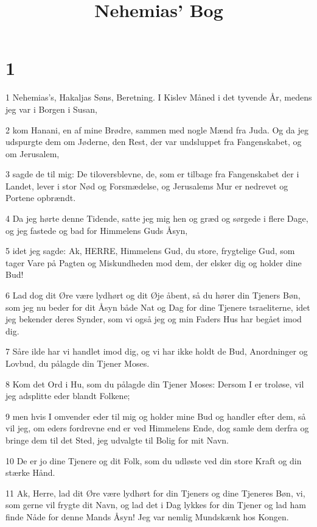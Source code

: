 

\title{Nehemias' Bog}


\chapter{1}

\par 1 Nehemias's, Hakaljas Søns, Beretning. I Kislev Måned i det tyvende År, medens jeg var i Borgen i Susan,
\par 2 kom Hanani, en af mine Brødre, sammen med nogle Mænd fra Juda. Og da jeg udspurgte dem om Jøderne, den Rest, der var undsluppet fra Fangenskabet, og om Jerusalem,
\par 3 sagde de til mig: De tiloversblevne, de, som er tilbage fra Fangenskabet der i Landet, lever i stor Nød og Forsmædelse, og Jerusalems Mur er nedrevet og Portene opbrændt.
\par 4 Da jeg hørte denne Tidende, satte jeg mig hen og græd og sørgede i flere Dage, og jeg fastede og bad for Himmelens Guds Åsyn,
\par 5 idet jeg sagde: Ak, HERRE, Himmelens Gud, du store, frygtelige Gud, som tager Vare på Pagten og Miskundheden mod dem, der elsker dig og holder dine Bud!
\par 6 Lad dog dit Øre være lydhørt og dit Øje åbent, så du hører din Tjeners Bøn, som jeg nu beder for dit Åsyn både Nat og Dag for dine Tjenere tsraeliterne, idet jeg bekender deres Synder, som vi også jeg og min Faders Hus har begået imod dig.
\par 7 Såre ilde har vi handlet imod dig, og vi har ikke holdt de Bud, Anordninger og Lovbud, du pålagde din Tjener Moses.
\par 8 Kom det Ord i Hu, som du pålagde din Tjener Moses: Dersom I er troløse, vil jeg adsplitte eder blandt Folkene;
\par 9 men hvis I omvender eder til mig og holder mine Bud og handler efter dem, så vil jeg, om eders fordrevne end er ved Himmelens Ende, dog samle dem derfra og bringe dem til det Sted, jeg udvalgte til Bolig for mit Navn.
\par 10 De er jo dine Tjenere og dit Folk, som du udløste ved din store Kraft og din stærke Hånd.
\par 11 Ak, Herre, lad dit Øre være lydhørt for din Tjeners og dine Tjeneres Bøn, vi, som gerne vil frygte dit Navn, og lad det i Dag lykkes for din Tjener og lad ham finde Nåde for denne Mands Åsyn! Jeg var nemlig Mundskænk hos Kongen.

